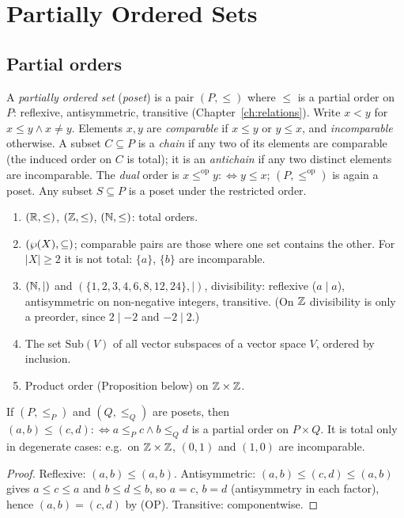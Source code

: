 \chapter{Partially Ordered Sets}\label{ch:orders}

\section{Partial orders}

\begin{definition}[Poset]
	A \emph{partially ordered set} (\emph{poset}) is a pair $(P,\le)$ where $\le$ is a partial order on $P$: reflexive, antisymmetric, transitive (Chapter~\ref{ch:relations}). Write $x<y$ for $x\le y\wedge x\ne y$. Elements $x,y$ are \emph{comparable} if $x\le y$ or $y\le x$, and \emph{incomparable} otherwise. A subset $C\subseteq P$ is a \emph{chain} if any two of its elements are comparable (the induced order on $C$ is total); it is an \emph{antichain} if any two distinct elements are incomparable. The \emph{dual} order is $x\le^{\mathrm{op}}y:\iff y\le x$; $(P,\le^{\mathrm{op}})$ is again a poset. Any subset $S\subseteq P$ is a poset under the restricted order.
\end{definition}

\begin{example}\label{ex:posets}
	\begin{enumerate}[label=(\arabic*)]
		\item $(\mathbb{R},\le)$, $(\mathbb{Z},\le)$, $(\mathbb{N},\le)$: total orders.
		\item $(\wp(X),\subseteq)$; comparable pairs are those where one set contains the other. For $|X|\ge2$ it is not total: $\{a\}$, $\{b\}$ are incomparable.
		\item $(\mathbb{N},\mid)$ and $(\{1,2,3,4,6,8,12,24\},\mid)$, divisibility: reflexive ($a\mid a$), antisymmetric on non-negative integers, transitive. (On $\mathbb{Z}$ divisibility is only a preorder, since $2\mid-2$ and $-2\mid2$.)
		\item The set $\mathrm{Sub}(V)$ of all vector subspaces of a vector space $V$, ordered by inclusion.
		\item Product order (Proposition below) on $\mathbb{Z}\times\mathbb{Z}$.
	\end{enumerate}
\end{example}

\begin{proposition}\label{prop:productorder}
	If $(P,\le_P)$ and $(Q,\le_Q)$ are posets, then $(a,b)\le(c,d):\iff a\le_Pc\wedge b\le_Qd$ is a partial order on $P\times Q$. It is total only in degenerate cases: e.g.\ on $\mathbb{Z}\times\mathbb{Z}$, $(0,1)$ and $(1,0)$ are incomparable.
\end{proposition}
\begin{proof}
	Reflexive: $(a,b)\le(a,b)$. Antisymmetric: $(a,b)\le(c,d)\le(a,b)$ gives $a\le c\le a$ and $b\le d\le b$, so $a=c$, $b=d$ (antisymmetry in each factor), hence $(a,b)=(c,d)$ by (OP). Transitive: componentwise.
\end{proof}

